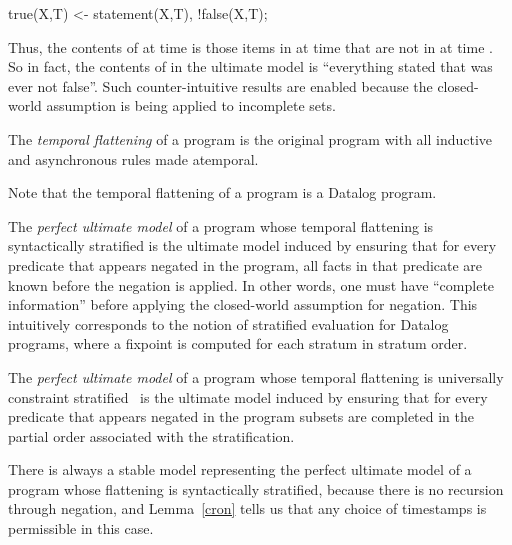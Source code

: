\begin{Dedalus}
true(X,T) <- statement(X,T), !false(X,T);
\end{Dedalus}

Thus, the contents of  at time  is those items in  at time  that are not in  at time .  So in fact, the contents of  in the ultimate model is ``everything stated that was ever not false''.  Such counter-intuitive results are enabled because the closed-world assumption is being applied to incomplete sets.

\begin{definition}
The {\em temporal flattening} of a \lang program is the original program with all inductive and asynchronous rules made atemporal.
\end{definition}

Note that the temporal flattening of a \lang program is a Datalog program.

\begin{definition}
The {\em perfect ultimate model} of a \lang program whose temporal flattening is syntactically stratified is the ultimate model induced by ensuring that for every predicate that appears negated in the program, all facts in that predicate are known before the negation is applied.  In other words, one must have ``complete information'' before applying the closed-world assumption for negation.  This intuitively corresponds to the notion of stratified evaluation for Datalog programs, where a fixpoint is computed for each stratum in stratum order.
\end{definition}

\begin{definition}
The {\em perfect ultimate model} of a \lang program whose temporal flattening is universally constraint stratified~\cite{ross-ucs} is the ultimate model induced by ensuring that for every predicate that appears negated in the program subsets are completed in the partial order associated with the stratification.
\end{definition}

There is always a stable model representing the perfect ultimate model of a \lang program whose flattening is syntactically stratified, because there is no recursion through negation, and Lemma~\ref{cron} tells us that any choice of timestamps is permissible in this case.

